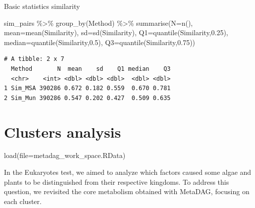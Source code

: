\documentclass[
  letterpaper,
  DIV=11,
  numbers=noendperiod]{scrreprt}
\newenvironment{Shaded}{}{}
\newcommand{\AttributeTok}[1]{\textcolor[rgb]{0.78,0.47,0.87}{#1}}
\newcommand{\FloatTok}[1]{\textcolor[rgb]{0.82,0.60,0.40}{#1}}
\newcommand{\FunctionTok}[1]{\textcolor[rgb]{0.38,0.69,0.94}{#1}}
\newcommand{\NormalTok}[1]{\textcolor[rgb]{0.67,0.70,0.75}{#1}}
\newcommand{\SpecialCharTok}[1]{\textcolor[rgb]{0.34,0.71,0.76}{#1}}
\newcommand{\StringTok}[1]{\textcolor[rgb]{0.60,0.76,0.47}{#1}}
\begin{document}
Basic statistics similarity

\begin{Shaded}
\begin{Highlighting}[]
\NormalTok{sim\_pairs }\SpecialCharTok{\%\textgreater{}\%} \FunctionTok{group\_by}\NormalTok{(Method) }\SpecialCharTok{\%\textgreater{}\%} 
  \FunctionTok{summarise}\NormalTok{(}\AttributeTok{N=}\FunctionTok{n}\NormalTok{(),}
          \AttributeTok{mean=}\FunctionTok{mean}\NormalTok{(Similarity),}
          \AttributeTok{sd=}\FunctionTok{sd}\NormalTok{(Similarity),}
          \AttributeTok{Q1=}\FunctionTok{quantile}\NormalTok{(Similarity,}\FloatTok{0.25}\NormalTok{),}
          \AttributeTok{median=}\FunctionTok{quantile}\NormalTok{(Similarity,}\FloatTok{0.5}\NormalTok{),}
          \AttributeTok{Q3=}\FunctionTok{quantile}\NormalTok{(Similarity,}\FloatTok{0.75}\NormalTok{))}
\end{Highlighting}
\end{Shaded}

\begin{verbatim}
# A tibble: 2 x 7
  Method       N  mean    sd    Q1 median    Q3
  <chr>    <int> <dbl> <dbl> <dbl>  <dbl> <dbl>
1 Sim_MSA 390286 0.672 0.182 0.559  0.670 0.781
2 Sim_Mun 390286 0.547 0.202 0.427  0.509 0.635
\end{verbatim}


\hypertarget{clusters-analysis}{%
\chapter{Clusters analysis}\label{clusters-analysis}}

\begin{Shaded}
\begin{Highlighting}[]
\FunctionTok{load}\NormalTok{(}\AttributeTok{file=}\StringTok{\textquotesingle{}metadag\_work\_space.RData\textquotesingle{}}\NormalTok{)}
\end{Highlighting}
\end{Shaded}

In the Eukaryotes test, we aimed to analyze which factors caused some
algae and plants to be distinguished from their respective kingdoms. To
address this question, we revisited the core metabolism obtained with
MetaDAG, focusing on each cluster.
\end{document}
